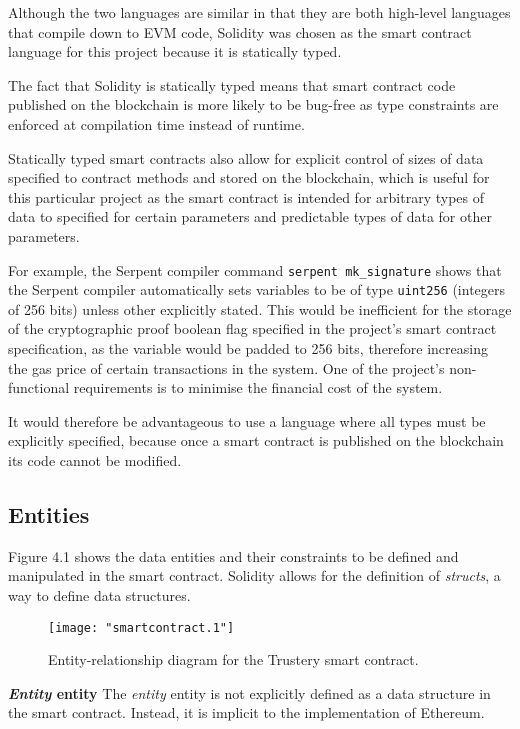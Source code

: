 \documentclass[12pt]{report}
\newcommand{\code}{\texttt}
\begin{document}
	Although the two languages are similar in that they are both high-level languages that compile down to EVM code, Solidity was chosen as the smart contract language for this project because it is statically typed.
	
	The fact that Solidity is statically typed means that smart contract code published on the blockchain is more likely to be bug-free as type constraints are enforced at compilation time instead of runtime.
	
	Statically typed smart contracts also allow for explicit control of sizes of data specified to contract methods and stored on the blockchain, which is useful for this particular project as the smart contract is intended for arbitrary types of data to specified for certain parameters and predictable types of data for other parameters.
	
	For example, the Serpent compiler command \code{serpent mk\_signature} shows that the Serpent compiler automatically sets variables to be of type \code{uint256} (integers of 256 bits) unless other explicitly stated. This would be inefficient for the storage of the cryptographic proof boolean flag specified in the project's smart contract specification, as the variable would be padded to 256 bits\cite{14}, therefore increasing the gas price of certain transactions in the system. One of the project's non-functional requirements is to minimise the financial cost of the system.
	
	It would therefore be advantageous to use a language where all types must be explicitly specified, because once a smart contract is published on the blockchain its code cannot be modified.
	
	\subsection{Entities}
	Figure 4.1 shows the data entities and their constraints to be defined and manipulated in the smart contract. Solidity allows for the definition of \textit{structs}, a way to define data structures.\cite{13}
	\begin{figure}[!ht]
		\centering
			\texttt{[image: "smartcontract.1"]}
		\caption{Entity-relationship diagram for the Trustery smart contract.}
	\end{figure}
	
	\bigskip
	\noindent \textbf{\textit{Entity} entity}\newline
	The \textit{entity} entity is not explicitly defined as a data structure in the smart contract. Instead, it is implicit to the implementation of Ethereum.
	
\end{document}
